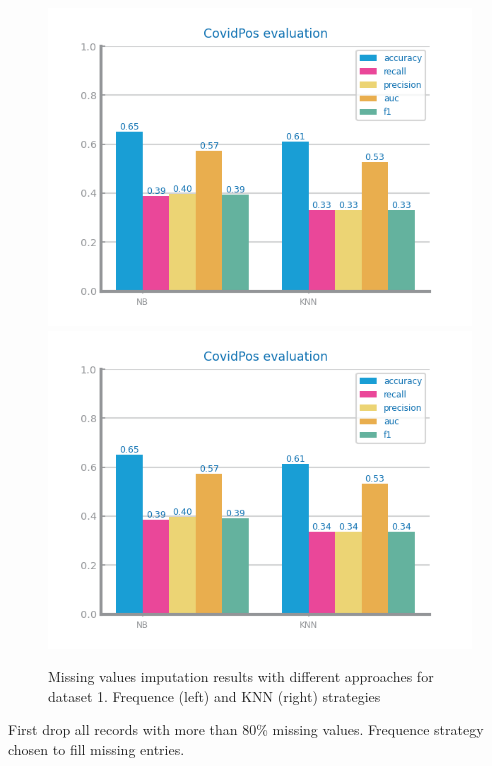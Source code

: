 \documentclass[10pt]{extarticle}
\begin{document}
\begin{figure}[H]
\centering\includegraphics[scale=0.80]{images/dataset1/data_preparation/CovidPos_mvi_freq_eval.png}
\includegraphics[scale=0.80]{images/dataset1/data_preparation/CovidPos_mvi_knn_eval.png}
\caption{Missing values imputation results with different approaches for dataset 1. Frequence (left) and KNN (right) strategies}
\end{figure}
First drop all records with more than 80\% missing values. Frequence strategy chosen to fill missing entries.
\end{document}
